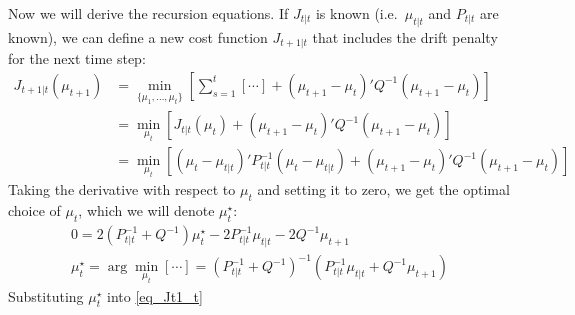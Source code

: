 \documentclass[11pt]{article}
\begin{document}
Now we will derive the recursion equations. If $J_{t|t}$ is known (i.e.\ $\mu_{t|t}$ and $P_{t|t}$ are known), we can define a new cost function $J_{t+1|t}$ that includes the drift penalty for the next time step:
\begin{align}
	J_{t+1|t}(\mu_{t+1}) 
	&= \min_{\{\mu_1, \dotsc, \mu_t\}} \left[ \sum_{s=1}^t [\cdots] + (\mu_{t+1}-\mu_t)' Q^{-1} (\mu_{t+1}-\mu_t) \right] \nonumber \\
	&= \min_{\mu_{t}} \left[J_{t|t}(\mu_{t}) + (\mu_{t+1} - \mu_{t})' Q^{-1} (\mu_{t+1} - \mu_{t})\right] \nonumber \\
	&= \min_{\mu_{t}} \left[(\mu_{t} - \mu_{t|t})' P_{t|t}^{-1} (\mu_t-\mu_{t|t}) + (\mu_{t+1}-\mu_t)'Q^{-1} (\mu_{t+1} - \mu_{t}) \right]
	\label{eq_Jt1_t}
\end{align}
Taking the derivative with respect to $\mu_t$ and setting it to zero, we get the optimal choice of $\mu_t$, which we will denote $\mu_t^{\star}$:
\begin{gather}
	0 = 2(P_{t|t}^{-1} + Q^{-1})\mu_t^\star - 2P_{t|t}^{-1}\mu_{t|t} - 2Q^{-1}\mu_{t+1} \nonumber \\
	\mu_t^\star = \arg \min_{\mu_t} [\cdots] = (P_{t|t}^{-1} + Q^{-1})^{-1} (P_{t|t}^{-1} \mu_{t|t} + Q^{-1} \mu_{t+1}) \label{eq_mu_t_star}
\end{gather}
Substituting $\mu_t^\star$ into \eqref{eq_Jt1_t}
\end{document}
